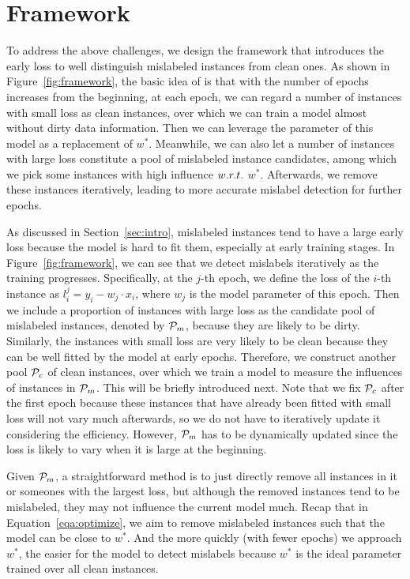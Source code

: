 \section{Framework} 
\label{sec:framework}

To address the above challenges, we design the \sys framework that introduces the early loss to well distinguish mislabeled instances from clean ones. As shown in Figure~\ref{fig:framework}, the basic idea of \sys is that with the number of epochs increases from the beginning, at each epoch, we can regard a number of  instances with small loss as clean instances, over which we  can train a model almost without  dirty data information. Then we can leverage the parameter of this model as a replacement of $w^*$. Meanwhile, we can also let a number of  instances with large  loss constitute  a pool of mislabeled instance candidates, among which we pick some  instances with high influence $w.r.t.$ $w^*$. Afterwards, we remove these instances iteratively, leading to more accurate mislabel detection for further epochs. 

 As discussed in Section~\ref{sec:intro},  mislabeled instances tend to have a large early loss because the model is hard to fit them, especially at early training stages. In Figure~\ref{fig:framework}, we can see that we detect mislabels iteratively  as the training progresses.
Specifically, at the  $j$-th  epoch,  we define the loss of the $i$-th instance  as  $l_i^j = y_i - w_j\cdot x_i$, where $w_j$ is the model parameter of this epoch. Then we include a proportion of instances with  large loss as the candidate pool of mislabeled instances, denoted by $\mathcal{P}_m$, because they are likely to be dirty. Similarly, the instances with small loss are very likely to be clean because they can be well fitted by the model at early epochs.  Therefore, we construct another  pool $\mathcal{P}_c$ of clean  instances, over which we train a model to measure the influences of instances in $\mathcal{P}_m$. This will be briefly introduced next. Note that we fix  $\mathcal{P}_c$ after the first epoch because these instances that have already been fitted with small loss will not vary much afterwards, so  we do not have to iteratively update it considering the efficiency. However, $\mathcal{P}_m$ has to be dynamically updated since the loss is likely to vary when it is large at the beginning.


 Given $\mathcal{P}_m$, a straightforward method is to   just directly remove all instances in it or someones with the largest loss, but although the removed instances tend to be mislabeled, they may not influence the current model much. Recap that in Equation~\ref{eqa:optimize},  we aim to remove mislabeled instances such that  the model can be close to $w^*$. And the more quickly (with fewer epochs) we approach  $w^*$, the easier for the model to detect mislabels because $w^*$ is the ideal parameter  trained over all clean instances. 

